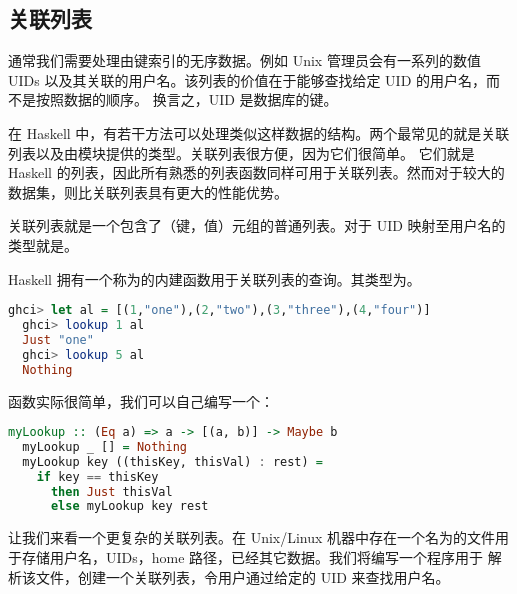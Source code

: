 \documentclass[./main.tex]{subfiles}
\begin{document}
\subsection*{关联列表}

通常我们需要处理由键索引的无序数据。例如 Unix 管理员会有一系列的数值 UIDs 以及其关联的用户名。该列表的价值在于能够查找给定 UID 的用户名，而不是按照数据的顺序。
换言之，UID 是数据库的键。

在 Haskell 中，有若干方法可以处理类似这样数据的结构。两个最常见的就是关联列表以及由模块提供的类型。关联列表很方便，因为它们很简单。
它们就是 Haskell 的列表，因此所有熟悉的列表函数同样可用于关联列表。然而对于较大的数据集，则比关联列表具有更大的性能优势。

关联列表就是一个包含了（键，值）元组的普通列表。对于 UID 映射至用户名的类型就是。

Haskell 拥有一个称为的内建函数用于关联列表的查询。其类型为。

\begin{lstlisting}[language=Haskell]
  ghci> let al = [(1,"one"),(2,"two"),(3,"three"),(4,"four")]
  ghci> lookup 1 al
  Just "one"
  ghci> lookup 5 al
  Nothing
\end{lstlisting}

函数实际很简单，我们可以自己编写一个：

\begin{lstlisting}[language=Haskell]
  myLookup :: (Eq a) => a -> [(a, b)] -> Maybe b
  myLookup _ [] = Nothing
  myLookup key ((thisKey, thisVal) : rest) =
    if key == thisKey
      then Just thisVal
      else myLookup key rest
\end{lstlisting}

让我们来看一个更复杂的关联列表。在 Unix/Linux 机器中存在一个名为的文件用于存储用户名，UIDs，home 路径，已经其它数据。我们将编写一个程序用于
解析该文件，创建一个关联列表，令用户通过给定的 UID 来查找用户名。
\end{document}
